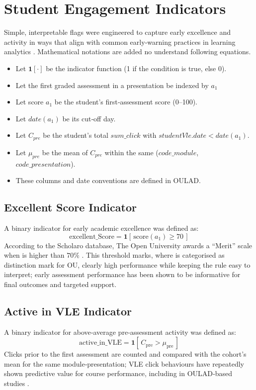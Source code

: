 \documentclass[ %
                    author={Carlos Duran Calle},
                supervisor={Dr. Felipe Campelo},
                    degree={MSc},
                     title={Comparative Machine Learning Analysis for Student Dropout Prediction in a Virtual Learning Environment},
                  subtitle={Incorporating Student Engagement and Socio-Economic Features},
                      type={},
                      year={2025}]{dissertation}
\begin{document}
\section{Student Engagement Indicators}
Simple, interpretable flags were engineered to capture early excellence and activity in ways that align with common early‑warning practices in learning analytics \cite{macfadyen_mining_2010}.
Mathematical notations are added no understand following equations.

\begin{itemize}
	\item Let $\mathbf{1}[\cdot]$ be the indicator function (1 if the condition is true, else 0).
	\item Let the first graded assessment in a presentation be indexed by $a_1$
	\item Let score $a_1$ be the student’s first‑assessment score (0–100).
	\item Let $date(a_1)$ be its cut‑off day.
	\item Let $C_{pre}$ be the student’s total $sum\_click$ with $studentVle.date < date(a_1)$.
	\item Let $\mu_{pre}$ be the mean of $C_{pre}$ within the same ($code\_module$, $code\_presentation$).
	\item These columns and date conventions are defined in OULAD.
\end{itemize}

\subsection{Excellent Score Indicator}
A binary indicator for early academic excellence was defined as:
\begin{equation}
	\text{excellent\_Score} = \mathbf{1}\!\left[ \, \text{score}(a_1) \geq 70 \, \right]
	\tag{2.1}
\end{equation}
According to the Scholaro database, The Open University awards a “Merit” scale when is higher than $70\%$ \cite{open_university_grading}. This threshold marks, where is categorised as distinction mark for OU, clearly high performance while keeping the rule easy to interpret; early assessment performance has been shown to be informative for final outcomes and targeted support.

\subsection{Active in VLE Indicator}
A binary indicator for above‑average pre‑assessment activity was defined as:
\begin{equation}
	\text{active\_in\_VLE} = \mathbf{1}\!\left[ \, C_{\text{pre}} > \mu_{\text{pre}} \, \right]
	\tag{2.2}
\end{equation}
Clicks prior to the first assessment are counted and compared with the cohort’s mean for the same module‑presentation; VLE click behaviours have repeatedly shown predictive value for course performance, including in OULAD‑based studies \cite{liu_predicting_2023}.
\end{document}
